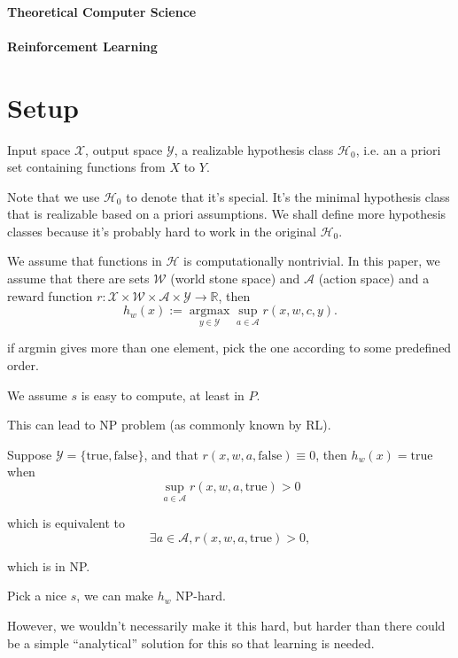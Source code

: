 \documentclass[11pt, oneside]{article}   	%
\theoremstyle{definition}
\begin{document}
\paragraph{Theoretical Computer Science}

\paragraph{Reinforcement Learning}

\section{Setup}

Input space $\mathcal{X}$, output space $\mathcal{Y}$, a realizable hypothesis class $\mathcal{H}_0$, i.e. an a priori set containing functions from $X$ to $Y$.

Note that we use $\mathcal{H}_0$ to denote that it's special. It's the minimal hypothesis class that is realizable based on a priori assumptions. We shall define more hypothesis classes because it's probably hard to work in the original $\mathcal{H}_0$.

We assume that functions in $\mathcal{H}$ is computationally nontrivial. In this paper, we assume that there are sets $\mathcal{W}$ (world stone space) and $\mathcal{A}$ (action space) and a reward function $r: \mathcal{X}\times \mathcal{W}\times \mathcal{A}\times \mathcal{Y}\to \mathbb{R}$, then
\begin{equation}
	h_{w}(x):=\mathop{\text{argmax}}\limits_{y\in \mathcal{Y}}\sup_{a\in \mathcal{A}} r(x, w, c, y).
\end{equation}

if argmin gives more than one element, pick the one according to some predefined order.

We assume $s$ is easy to compute, at least in $P$.

\begin{rmk}
	This can lead to NP problem (as commonly known by RL).

	Suppose $\mathcal{Y} = \{\text{true}, \text{false}\}$, and that $r(x,w,a,\text{false})\equiv 0$, then $h_w(x)=\text{true}$ when
	\begin{equation}
		\sup_{a\in \mathcal{A}}r(x, w, a, \text{true}) > 0
	\end{equation}

	which is equivalent to
	\begin{equation}
		\exists a\in \mathcal{A}, r(x, w, a, \text{true}) > 0,
	\end{equation}

	which is in NP.

	Pick a nice $s$, we can make $h_w$ NP-hard.

	However, we wouldn't necessarily make it this hard, but harder than there could be a simple ``analytical'' solution for this so that learning is needed.
\end{rmk}
\end{document}
